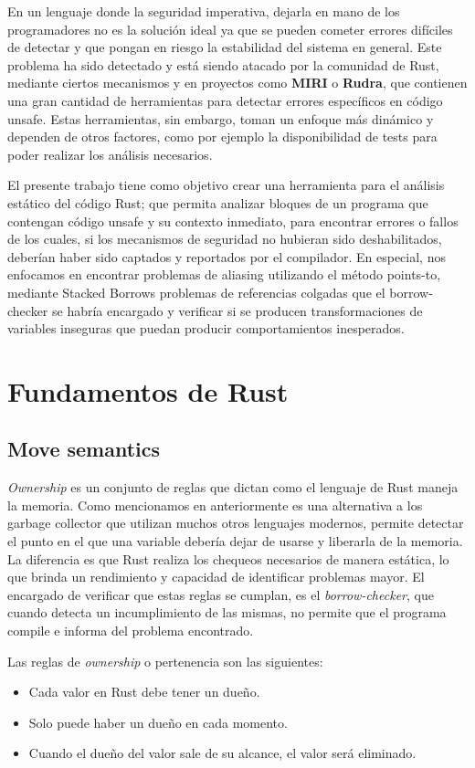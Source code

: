 En un lenguaje donde la seguridad imperativa, dejarla en mano de los programadores no es la solución ideal ya que se pueden cometer errores difíciles de detectar y que pongan en riesgo la estabilidad del sistema en general. Este problema ha sido detectado y está siendo atacado por la comunidad de Rust, mediante ciertos mecanismos y en proyectos como \textbf{MIRI} o \textbf{Rudra}, que contienen una gran cantidad de herramientas para detectar errores específicos en código unsafe. Estas herramientas, sin embargo, toman un enfoque más dinámico y dependen de otros factores, como por ejemplo la disponibilidad de tests para poder realizar los análisis necesarios.

El presente trabajo tiene como objetivo crear una herramienta para el análisis estático del código Rust; que permita analizar bloques de un programa que contengan código unsafe y su contexto inmediato, para encontrar errores o fallos de los cuales, si los mecanismos de seguridad no hubieran sido deshabilitados, deberían haber sido captados y reportados por el compilador. En especial, nos enfocamos en encontrar problemas de aliasing utilizando el método points-to, mediante Stacked Borrows problemas de referencias colgadas que el borrow-checker se habría encargado y verificar si se producen transformaciones de variables inseguras que puedan producir comportamientos inesperados.


\section{Fundamentos de Rust}
\subsection{Move semantics}

\textit{Ownership} es un conjunto de reglas que dictan como el lenguaje de Rust maneja la memoria. Como mencionamos en anteriormente es una alternativa a los garbage collector que utilizan muchos otros lenguajes modernos, permite detectar el punto en el que una variable debería dejar de usarse y liberarla de la memoria. La diferencia es que Rust realiza los chequeos necesarios de manera estática, lo que brinda un rendimiento y capacidad de identificar problemas mayor. El encargado de verificar que estas reglas se cumplan, es el \textit{borrow-checker}, que cuando detecta un incumplimiento de las mismas, no permite que el programa compile e informa del problema encontrado.

Las reglas de \textit{ownership} o pertenencia son las siguientes:
\begin{itemize}[noitemsep, nolistsep]
    \item Cada valor en Rust debe tener un dueño.
    \item Solo puede haber un dueño en cada momento.
    \item Cuando el dueño del valor sale de su alcance, el valor será eliminado.
\end{itemize}

